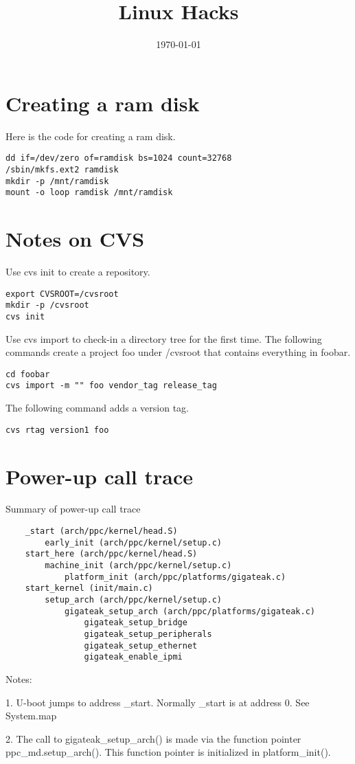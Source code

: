 \documentclass[11pt]{article}
\title{Linux Hacks}
\date{\today}
\begin{document}
\maketitle

\newpage

\tableofcontents

\newpage

\section{Creating a ram disk}
Here is the code for creating a ram disk.

\begin{verbatim}
dd if=/dev/zero of=ramdisk bs=1024 count=32768
/sbin/mkfs.ext2 ramdisk
mkdir -p /mnt/ramdisk
mount -o loop ramdisk /mnt/ramdisk
\end{verbatim}

\section{Notes on CVS}
Use cvs init to create a repository.

\begin{verbatim}
export CVSROOT=/cvsroot
mkdir -p /cvsroot
cvs init
\end{verbatim}

\noindent
Use cvs import to check-in a directory tree for the first time.
The following commands create a project foo under /cvsroot that
contains everything in foobar.

\begin{verbatim}
cd foobar
cvs import -m "" foo vendor_tag release_tag
\end{verbatim}

\noindent
The following command adds a version tag.

\begin{verbatim}
cvs rtag version1 foo
\end{verbatim}

\section{Power-up call trace}

Summary of power-up call trace

\begin{verbatim}
	_start (arch/ppc/kernel/head.S)
		early_init (arch/ppc/kernel/setup.c)
	start_here (arch/ppc/kernel/head.S)
		machine_init (arch/ppc/kernel/setup.c)
			platform_init (arch/ppc/platforms/gigateak.c)
	start_kernel (init/main.c)
		setup_arch (arch/ppc/kernel/setup.c)
			gigateak_setup_arch (arch/ppc/platforms/gigateak.c)
				gigateak_setup_bridge
				gigateak_setup_peripherals
				gigateak_setup_ethernet
				gigateak_enable_ipmi
\end{verbatim}

Notes:

1. U-boot jumps to address \_start.
Normally \_start is at address 0. See System.map

2. The call to gigateak\_setup\_arch() is made via the function pointer
ppc\_md.setup\_arch().
This function pointer is initialized in platform\_init().
\end{document}

